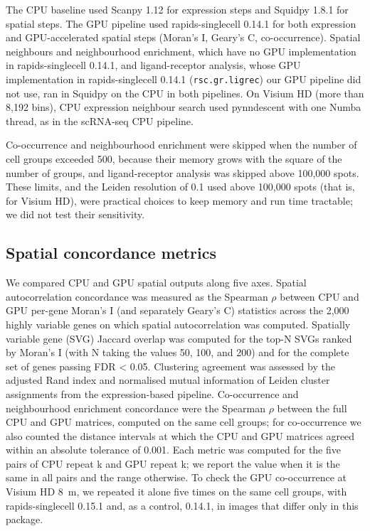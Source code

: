 \documentclass[runningheads]{llncs}
\begin{document}
The CPU baseline used Scanpy 1.12 for expression steps and Squidpy 1.8.1 \cite{Palla2022} for spatial steps.
The GPU pipeline used rapids-singlecell 0.14.1 for both expression and GPU-accelerated spatial steps (Moran's I, Geary's C, co-occurrence).
Spatial neighbours and neighbourhood enrichment, which have no GPU implementation in rapids-singlecell 0.14.1, and ligand-receptor analysis, whose GPU implementation in rapids-singlecell 0.14.1 (\texttt{rsc.gr.ligrec}) our GPU pipeline did not use, ran in Squidpy on the CPU in both pipelines. On Visium HD (more than 8,192 bins), CPU expression neighbour search used pynndescent with one Numba thread, as in the scRNA-seq CPU pipeline.

Co-occurrence and neighbourhood enrichment were skipped when the number of cell groups exceeded 500, because their memory grows with the square of the number of groups, and ligand-receptor analysis was skipped above 100,000 spots. These limits, and the Leiden resolution of 0.1 used above 100,000 spots (that is, for Visium HD), were practical choices to keep memory and run time tractable; we did not test their sensitivity.

\hypertarget{spatial-concordance-metrics}{%
\subsection{Spatial concordance metrics}\label{spatial-concordance-metrics}}

We compared CPU and GPU spatial outputs along five axes. Spatial autocorrelation concordance was measured as the Spearman $\rho$ between CPU and GPU per-gene Moran's I (and separately Geary's C) statistics across the 2,000 highly variable genes on which spatial autocorrelation was computed. Spatially variable gene (SVG) Jaccard overlap was computed for the top-N SVGs ranked by Moran's I (with N taking the values 50, 100, and 200) and for the complete set of genes passing FDR \textless{} 0.05. Clustering agreement was assessed by the adjusted Rand index and normalised mutual information of Leiden cluster assignments from the expression-based pipeline. Co-occurrence and neighbourhood enrichment concordance were the Spearman $\rho$ between the full CPU and GPU matrices, computed on the same cell groups; for co-occurrence we also counted the distance intervals at which the CPU and GPU matrices agreed within an absolute tolerance of 0.001. Each metric was computed for the five pairs of CPU repeat k and GPU repeat k; we report the value when it is the same in all pairs and the range otherwise. To check the GPU co-occurrence at Visium HD 8~\textmu{}m, we repeated it alone five times on the same cell groups, with rapids-singlecell 0.15.1 and, as a control, 0.14.1, in images that differ only in this package.
\end{document}
